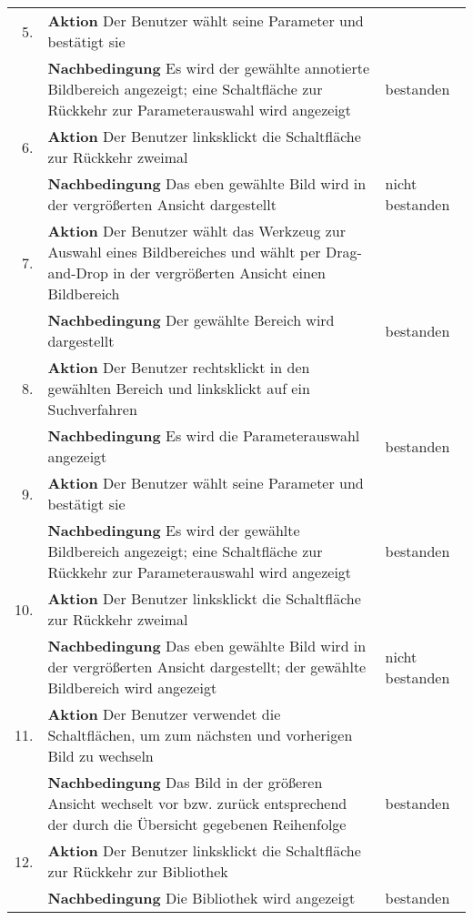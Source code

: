 \begin{enumerate} [label=\bfseries /TS \arabic*0/, leftmargin=*]
	\begin{tabular}{@{}rp{4in}|l}
	5. & \textbf{Aktion} Der Benutzer wählt seine Parameter und bestätigt sie & \\
	   & \textbf{Nachbedingung} Es wird der gewählte annotierte Bildbereich angezeigt; eine Schaltfläche zur Rückkehr zur Parameterauswahl wird angezeigt & bestanden \\
	\hline
	6. & \textbf{Aktion} Der Benutzer linksklickt die Schaltfläche zur Rückkehr zweimal & \\
	   & \textbf{Nachbedingung}	Das eben gewählte Bild wird in der vergrößerten Ansicht dargestellt & nicht bestanden\\
	\hline
	7. & \textbf{Aktion} Der Benutzer wählt das Werkzeug zur Auswahl eines Bildbereiches und wählt per Drag-and-Drop in der vergrößerten Ansicht einen Bildbereich & \\
	   & \textbf{Nachbedingung} Der gewählte Bereich wird dargestellt & bestanden \\
	\hline	
	8. & \textbf{Aktion} Der Benutzer rechtsklickt in den gewählten Bereich und linksklickt auf ein Suchverfahren & \\
	   & \textbf{Nachbedingung} Es wird die Parameterauswahl angezeigt & bestanden \\
	\hline	
	9. & \textbf{Aktion} Der Benutzer wählt seine Parameter und bestätigt sie & \\
	   & \textbf{Nachbedingung} Es wird der gewählte Bildbereich angezeigt; eine Schaltfläche zur Rückkehr zur Parameterauswahl wird angezeigt & bestanden \\
	\hline   
   10. & \textbf{Aktion} Der Benutzer linksklickt die Schaltfläche zur Rückkehr zweimal & \\
	   & \textbf{Nachbedingung} Das eben gewählte Bild wird in der vergrößerten Ansicht dargestellt; der gewählte Bildbereich wird angezeigt & nicht bestanden \\
	\hline
   11. & \textbf{Aktion} Der Benutzer verwendet die Schaltflächen, um zum nächsten und vorherigen Bild zu wechseln & \\
	   & \textbf{Nachbedingung} Das Bild in der größeren Ansicht wechselt vor bzw. zurück entsprechend der durch die Übersicht gegebenen Reihenfolge & bestanden \\
	\hline
   12. & \textbf{Aktion} Der Benutzer linksklickt die Schaltfläche zur Rückkehr zur Bibliothek & \\
	   & \textbf{Nachbedingung} Die Bibliothek wird angezeigt & bestanden \\

\end{tabular}
\end{enumerate}
